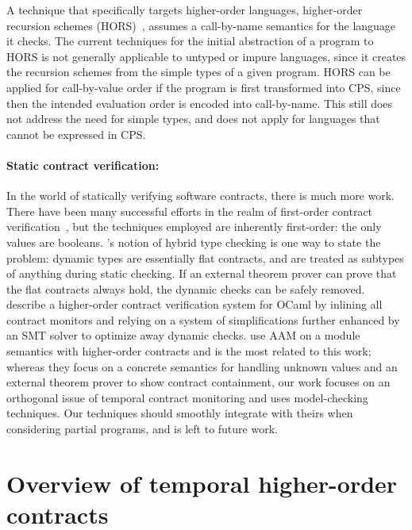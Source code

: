 \documentclass[preprint,onecolumn,9pt]{sigplanconf} %
\begin{document}
A technique that specifically targets higher-order languages, higher-order recursion schemes (HORS)~\citep{ianjohnson:Knapik:2002:HPT:646794.704852}, assumes a call-by-name semantics for the language it checks.
%
The current techniques for the initial abstraction of a program to HORS is not generally applicable to untyped or impure languages, since it creates the recursion schemes from the simple types of a given program.
%
HORS can be applied for call-by-value order if the program is first transformed into CPS, since then the intended evaluation order is encoded into call-by-name.
%
This still does not address the need for simple types, and does not apply for languages that cannot be expressed in CPS.

\paragraph{Static contract verification:}
In the world of statically verifying software contracts, there is much more work.
%
There have been many successful efforts in the realm of first-order contract verification~\citep{ianjohnson:fahndrich:contracts:2011,ianjohnson:vcc:2009}, but the techniques employed are inherently first-order: the only values are booleans.
%
\citet{ianjohnson:Flanagan:2006:HTC:1111037.1111059}'s notion of hybrid type checking is one way to state the problem: dynamic types are essentially flat contracts, and are treated as subtypes of anything during static checking.
%
If an external theorem prover can prove that the flat contracts always hold, the dynamic checks can be safely removed.
%
\citet{dvanhorn:Xu2012Hybrid} describe a higher-order contract verification system for OCaml by inlining all contract monitors and relying on a system of simplifications further enhanced by an SMT solver to optimize away dynamic checks.
%
\citet{dvanhorn:TobinHochstadt2012Higherorder} use AAM on a module semantics with higher-order contracts and is the most related to this work; whereas they focus on a concrete semantics for handling unknown values and an external theorem prover to show contract containment, our work focuses on an orthogonal issue of temporal contract monitoring and uses model-checking techniques.
%
Our techniques should smoothly integrate with theirs when considering partial programs, and is left to future work.

\section{Overview of temporal higher-order contracts}
\end{document}
